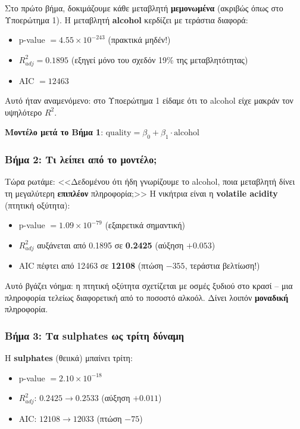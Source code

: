 \documentclass[12pt,a4paper]{article}
\begin{document}
Στο πρώτο βήμα, δοκιμάζουμε κάθε μεταβλητή \textbf{μεμονωμένα} (ακριβώς όπως στο Υποερώτημα 1). Η μεταβλητή \textbf{alcohol} κερδίζει με τεράστια διαφορά:
\begin{itemize}
    \item p-value $= 4.55 \times 10^{-243}$ (πρακτικά μηδέν!)
    \item $R^2_{adj} = 0.1895$ (εξηγεί μόνο του σχεδόν 19\% της μεταβλητότητας)
    \item AIC $= 12463$
\end{itemize}

Αυτό ήταν αναμενόμενο: στο Υποερώτημα 1 είδαμε ότι το alcohol είχε μακράν τον υψηλότερο $R^2$.

\textbf{Μοντέλο μετά το Βήμα 1}: $\text{quality} = \beta_0 + \beta_1 \cdot \text{alcohol}$

\subsubsection{Βήμα 2: Τι λείπει από το μοντέλο;}

Τώρα ρωτάμε: <<Δεδομένου ότι ήδη γνωρίζουμε το alcohol, ποια μεταβλητή δίνει τη μεγαλύτερη \textbf{επιπλέον} πληροφορία;>> Η νικήτρια είναι η \textbf{volatile acidity} (πτητική οξύτητα):
\begin{itemize}
    \item p-value $= 1.09 \times 10^{-79}$ (εξαιρετικά σημαντική)
    \item $R^2_{adj}$ αυξάνεται από 0.1895 σε \textbf{0.2425} (αύξηση $+0.053$)
    \item AIC πέφτει από 12463 σε \textbf{12108} (πτώση $-355$, τεράστια βελτίωση!)
\end{itemize}

Αυτό βγάζει νόημα: η πτητική οξύτητα σχετίζεται με οσμές ξυδιού στο κρασί -- μια πληροφορία τελείως διαφορετική από το ποσοστό αλκοόλ. Δίνει λοιπόν \textbf{μοναδική} πληροφορία.

\subsubsection{Βήμα 3: Τα sulphates ως τρίτη δύναμη}

Η \textbf{sulphates} (θειικά) μπαίνει τρίτη:
\begin{itemize}
    \item p-value $= 2.10 \times 10^{-18}$
    \item $R^2_{adj}$: $0.2425 \to 0.2533$ (αύξηση $+0.011$)
    \item AIC: $12108 \to 12033$ (πτώση $-75$)
\end{itemize}
\end{document}
